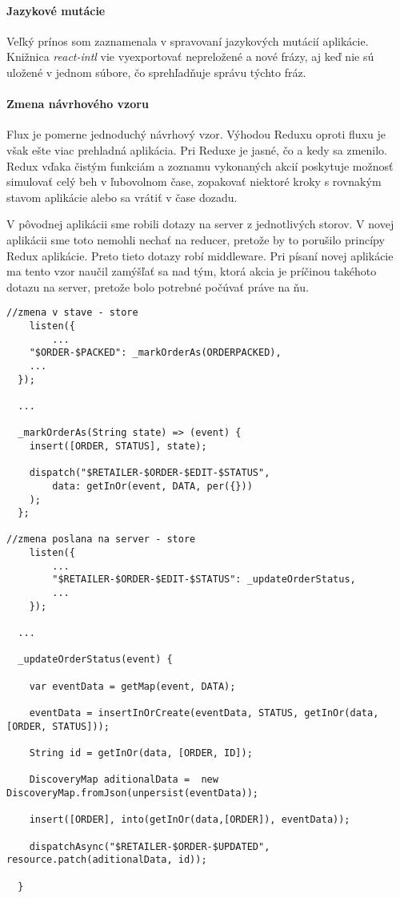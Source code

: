 \paragraph{Jazykové mutácie}
Veľký prínos som zaznamenala v spravovaní jazykových mutácií aplikácie. Knižnica \emph{react-intl} vie vyexportovať nepreložené a nové frázy, aj keď nie sú uložené v jednom súbore, čo sprehľadňuje správu týchto fráz.

\paragraph{Zmena návrhového vzoru}
Flux je pomerne jednoduchý návrhový vzor. Výhodou Reduxu oproti fluxu je však ešte viac prehladná aplikácia. Pri Reduxe je jasné, čo a kedy sa zmenilo. Redux vďaka čistým funkciám a zoznamu vykonaných akcií poskytuje možnosť simulovať celý beh v ľubovolnom čase, zopakovať niektoré kroky s rovnakým stavom aplikácie alebo sa vrátiť v čase dozadu.

V pôvodnej aplikácii sme robili dotazy na server z jednotlivých storov. V novej aplikácii sme toto nemohli nechať na reducer, pretože by to porušilo princípy Redux aplikácie. Preto tieto dotazy robí middleware. Pri písaní novej aplikácie ma tento vzor naučil zamýšľať sa nad tým, ktorá akcia je príčinou takéhoto dotazu na server, pretože bolo potrebné počúvať práve na ňu.


\begin{lstlisting}[caption=Dotaz na server vo Flux-e v store]
//zmena v stave - store
	listen({
		...
    "$ORDER-$PACKED": _markOrderAs(ORDERPACKED),
    ...
  });

  ...

  _markOrderAs(String state) => (event) {
    insert([ORDER, STATUS], state);

    dispatch("$RETAILER-$ORDER-$EDIT-$STATUS",
        data: getInOr(event, DATA, per({}))
    );
  };

//zmena poslana na server - store
	listen({
		...
		"$RETAILER-$ORDER-$EDIT-$STATUS": _updateOrderStatus,
		...
	});

  ...

  _updateOrderStatus(event) {

    var eventData = getMap(event, DATA);

    eventData = insertInOrCreate(eventData, STATUS, getInOr(data, [ORDER, STATUS]));

    String id = getInOr(data, [ORDER, ID]);

    DiscoveryMap aditionalData =  new DiscoveryMap.fromJson(unpersist(eventData));

    insert([ORDER], into(getInOr(data,[ORDER]), eventData));

    dispatchAsync("$RETAILER-$ORDER-$UPDATED", resource.patch(aditionalData, id));

  }
\end{lstlisting}

